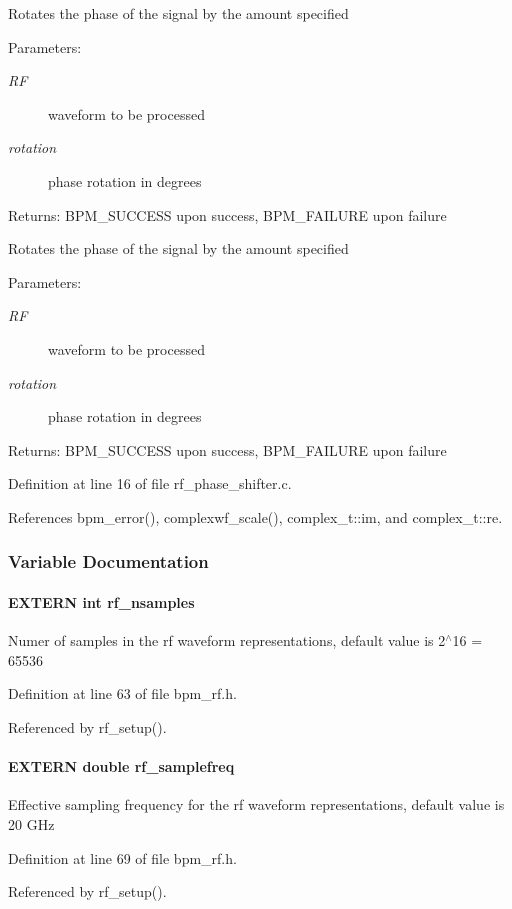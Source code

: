 Rotates the phase of the signal by the amount specified \begin{Desc}
\item[Parameters:]
\begin{description}
\item[{\em RF}]waveform to be processed \item[{\em rotation}]phase rotation in degrees \end{description}
\end{Desc}
\begin{Desc}
\item[Returns:]BPM\_\-SUCCESS upon success, BPM\_\-FAILURE upon failure\end{Desc}
Rotates the phase of the signal by the amount specified \begin{Desc}
\item[Parameters:]
\begin{description}
\item[{\em RF}]waveform to be processed \item[{\em rotation}]phase rotation in degrees \end{description}
\end{Desc}
\begin{Desc}
\item[Returns:]BPM\_\-SUCCESS upon success, BPM\_\-FAILURE upon failure \end{Desc}


Definition at line 16 of file rf\_\-phase\_\-shifter.c.

References bpm\_\-error(), complexwf\_\-scale(), complex\_\-t::im, and complex\_\-t::re.

\subsubsection{Variable Documentation}
\paragraph[rf\_\-nsamples]{\setlength{\rightskip}{0pt plus 5cm}EXTERN int {\bf rf\_\-nsamples}}\hfill\label{group__rf_g48e966362ef9264637e063fd53d8ae6d}


Numer of samples in the rf waveform representations, default value is 2$^\wedge$16 = 65536 

Definition at line 63 of file bpm\_\-rf.h.

Referenced by rf\_\-setup().
\paragraph[rf\_\-samplefreq]{\setlength{\rightskip}{0pt plus 5cm}EXTERN double {\bf rf\_\-samplefreq}}\hfill\label{group__rf_g02c6c1ab51fc18ce03f4ed2b6db98198}


Effective sampling frequency for the rf waveform representations, default value is 20 GHz 

Definition at line 69 of file bpm\_\-rf.h.

Referenced by rf\_\-setup().
